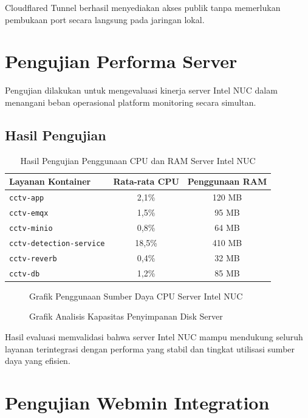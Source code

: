 Cloudflared Tunnel berhasil menyediakan akses publik tanpa memerlukan pembukaan port secara langsung pada jaringan lokal.

\section{Pengujian Performa Server}

Pengujian dilakukan untuk mengevaluasi kinerja server Intel NUC dalam menangani beban operasional platform monitoring secara simultan.

\subsection{Hasil Pengujian}

\begin{table}[H]
	\centering
	\caption{Hasil Pengujian Penggunaan CPU dan RAM Server Intel NUC}
	\begin{tabular}{|l|c|c|}
		\hline
		Layanan Kontainer & Rata-rata CPU & Penggunaan RAM \\
		\hline
		\texttt{cctv-app} & 2,1\% & 120 MB \\
		\texttt{cctv-emqx} & 1,5\% & 95 MB \\
		\texttt{cctv-minio} & 0,8\% & 64 MB \\
		\texttt{cctv-detection-service} & 18,5\% & 410 MB \\
		\texttt{cctv-reverb} & 0,4\% & 32 MB \\
		\texttt{cctv-db} & 1,2\% & 85 MB \\
		\hline
	\end{tabular}
\end{table}

\begin{figure}[H]
\centering
\caption{Grafik Penggunaan Sumber Daya CPU Server Intel NUC}
\label{fig:cpu_usage_graph}
\end{figure}

\begin{figure}[H]
\centering
\caption{Grafik Analisis Kapasitas Penyimpanan Disk Server}
\label{fig:storage_usage_graph}
\end{figure}

Hasil evaluasi memvalidasi bahwa server Intel NUC mampu mendukung seluruh layanan terintegrasi dengan performa yang stabil dan tingkat utilisasi sumber daya yang efisien.

\section{Pengujian Webmin Integration}

